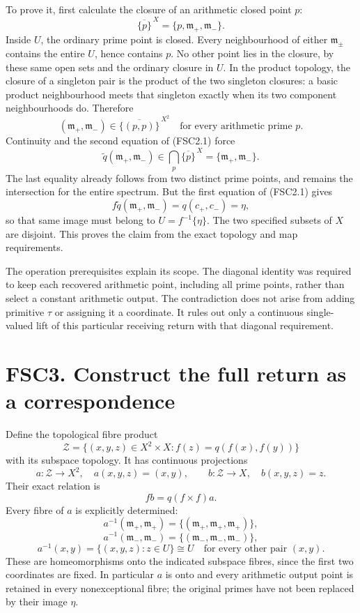 To prove it, first calculate the closure of an arithmetic closed point
\(p\): \[
\overline{\{p\}}^{\,X}=\{p,\mathfrak m_+,\mathfrak m_-\}.
\tag{FSC2.2}
\] Inside \(U\), the ordinary prime point is closed. Every neighbourhood
of either \(\mathfrak m_\pm\) contains the entire \(U\), hence contains
\(p\). No other point lies in the closure, by these same open sets and
the ordinary closure in \(U\). In the product topology, the closure of a
singleton pair is the product of the two singleton closures: a basic
product neighbourhood meets that singleton exactly when its two
component neighbourhoods do. Therefore \[
(\mathfrak m_+,\mathfrak m_-)\in\overline{\{(p,p)\}}^{\,X^2}
\quad\text{for every arithmetic prime }p.
\] Continuity and the second equation of (FSC2.1) force \[
\widetilde q(\mathfrak m_+,\mathfrak m_-)
\in\bigcap_p\overline{\{p\}}^{\,X}
=\{\mathfrak m_+,\mathfrak m_-\}.
\tag{FSC2.3}
\] The last equality already follows from two distinct prime points, and
remains the intersection for the entire spectrum. But the first equation
of (FSC2.1) gives \[
f\widetilde q(\mathfrak m_+,\mathfrak m_-)=q(c_+,c_-)=\eta,
\] so that same image must belong to \(U=f^{-1}\{\eta\}\). The two
specified subsets of \(X\) are disjoint. This proves the claim from the
exact topology and map requirements.

The operation prerequisites explain its scope. The diagonal identity was
required to keep each recovered arithmetic point, including all prime
points, rather than select a constant arithmetic output. The
contradiction does not arise from adding primitive \(\tau\) or assigning
it a coordinate. It rules out only a continuous single-valued lift of
this particular receiving return with that diagonal requirement.

\section{FSC3. Construct the full return as a
correspondence}\label{fsc3.-construct-the-full-return-as-a-correspondence}

Define the topological fibre product \[
\mathcal Z=\{(x,y,z)\in X^2\times X:f(z)=q(f(x),f(y))\}
\tag{FSC3.1}
\] with its subspace topology. It has continuous projections \[
a:\mathcal Z\to X^2,\quad a(x,y,z)=(x,y),\qquad
b:\mathcal Z\to X,\quad b(x,y,z)=z.
\tag{FSC3.2}
\] Their exact relation is \[
fb=q(f\times f)a.
\tag{FSC3.3}
\] Every fibre of \(a\) is explicitly determined: \[
a^{-1}(\mathfrak m_+,\mathfrak m_+)=\{(\mathfrak m_+,\mathfrak m_+,\mathfrak m_+)\},
\] \[
a^{-1}(\mathfrak m_-,\mathfrak m_-)=\{(\mathfrak m_-,\mathfrak m_-,\mathfrak m_-)\},
\] \[
a^{-1}(x,y)=\{(x,y,z):z\in U\}\cong U
\quad\text{for every other pair }(x,y).
\tag{FSC3.4}
\] These are homeomorphisms onto the indicated subspace fibres, since
the first two coordinates are fixed. In particular \(a\) is onto and
every arithmetic output point is retained in every nonexceptional fibre;
the original primes have not been replaced by their image \(\eta\).

